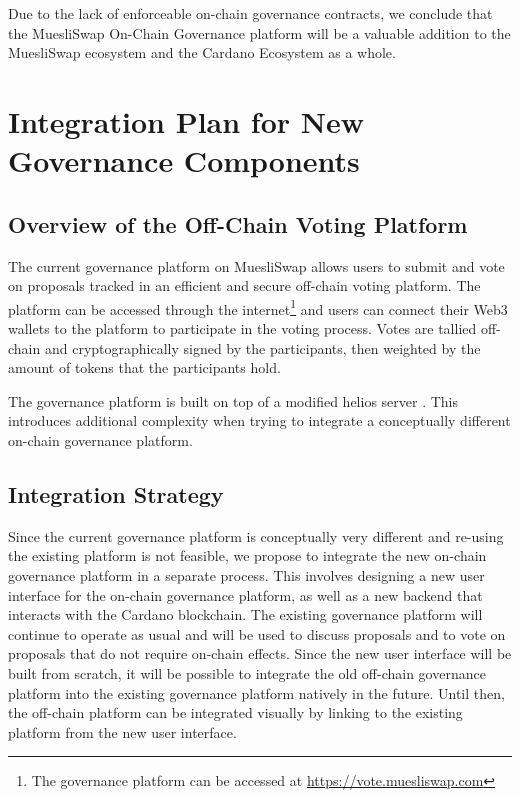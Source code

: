 \documentclass[11pt]{article}
\begin{document}
Due to the lack of enforceable on-chain governance contracts, we conclude that the MuesliSwap On-Chain Governance platform will be a valuable addition to the MuesliSwap ecosystem and the Cardano Ecosystem as a whole.

\section{Integration Plan for New Governance Components}
\subsection{Overview of the Off-Chain Voting Platform}

The current governance platform on MuesliSwap allows users to submit and vote on proposals tracked in an efficient and secure off-chain voting platform.
The platform can be accessed through the internet\footnote{The governance platform can be accessed at \url{https://vote.muesliswap.com}} and users can connect
their Web3 wallets to the platform to participate in the voting process.
Votes are tallied off-chain and cryptographically signed by the participants, then weighted by the amount of tokens that the participants hold.

The governance platform is built on top of a modified helios server \cite{DBLP:conf/uss/Adida08}.
This introduces additional complexity when trying to integrate a conceptually different on-chain governance platform.

\subsection{Integration Strategy}

Since the current governance platform is conceptually very different and re-using the existing platform is not feasible,
we propose to integrate the new on-chain governance platform in a separate process.
This involves designing a new user interface for the on-chain governance platform,
as well as a new backend that interacts with the Cardano blockchain.
The existing governance platform will continue to operate as usual and will be used to discuss proposals and to vote on proposals that do not require on-chain effects.
Since the new user interface will be built from scratch, it will be possible to integrate the old off-chain governance platform into the existing governance platform natively in the future.
Until then, the off-chain platform can be integrated visually by linking to the existing platform from the new user interface.
\end{document}
